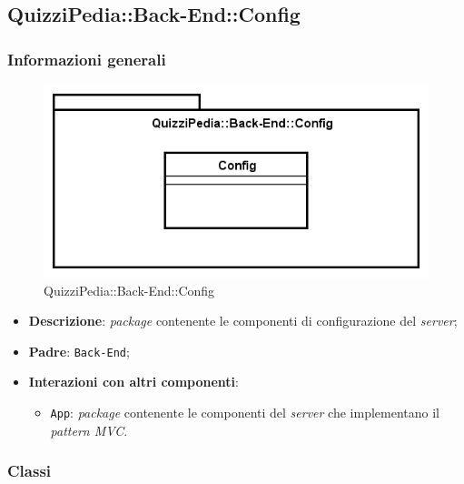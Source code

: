 \subsection{QuizziPedia::Back-End::Config}
\subsubsection{Informazioni generali}
\label{QuizziPedia::Back-End::Config}
\begin{figure}[ht]
	\centering
	\includegraphics[scale=0.8]{UML/Package/QuizziPedia_Back-End_Config.png}
	\caption{QuizziPedia::Back-End::Config}
\end{figure}
\FloatBarrier
	\begin{itemize}
		\item \textbf{Descrizione}:
		\textit{package} contenente le componenti di configurazione del \textit{server};
		\item \textbf{Padre}: \texttt{Back-End};
		\item \textbf{Interazioni con altri componenti}:
			\begin{itemize}
				\item \texttt{App}:
				\textit{package} contenente le componenti del \textit{server} che implementano il \textit{pattern MVC}.
			\end{itemize}
	\end{itemize}
\subsubsection{Classi}
